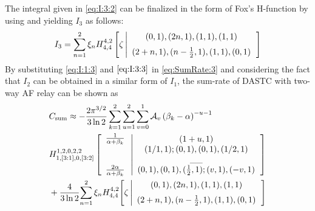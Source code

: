 \documentclass[conference]{IEEEtran}
\newcommand{\Rsum}{C_{\text{sum}}}
\begin{document}
%
%
The integral given in \eqref{eq:I:3:2} can be finalized in the form
of Fox's H-function by using \cite[eq.~(7.811.1)]{GR:00:Book} and
\cite[eq.~(8.3.2.21)]{Prudnikov:90:Book} yielding $I_3$ as follows:
%
%
\begin{align} \label{eq:I:3:3}
    I_3
    =
    \sum\limits_{n=1}^2
    \xi_n
    H_{4,4}^{4,2}\left[{\zeta} \left|{\begin{array}{*{20}c} {(0,1),(2n,1),(1,1),(1,1)}  \vspace{0.2cm}\\
    {(2+n,1),(n-\tfrac{1}{2},1),(1,1),(0,1)} \end{array}} \right.
    \right]
\end{align}
%
%
By substituting \eqref{eq:I:1:3} and $\eqref{eq:I:3:3}$ in
\eqref{eq:SumRate:3} and considering the fact that $I_2$ can be
obtained in a similar form of $I_1$, the sum-rate of DASTC with
two-way AF relay can be shown as
%
%
\begin{align}
    &\Rsum
    \approx
    -\frac{2\pi^{3/2}}{3\ln 2}
    \sum\limits_{k=1}^2
    \sum\limits_{u=1}^{2}
    \sum\limits_{v=0}^{1}
    \mathcal{A}_v
    \left(\beta_k - \alpha\right)^{-u-1}
    \nonumber
    \\
    &
H_{1,[3:1],0,[3:2]}^{1,2,0,2,2}\left[ {\begin{array}{*{20}c}
   \frac{1}{\alpha+\beta_k}  \\
   \\
   \\
   \frac{2\alpha}{\alpha+\beta_k}  \\
\end{array}\left| {\begin{array}{*{20}c}
   (1+u,1)  \\
   (1/1,1);(0,1),(0,1),(1/2,1)  \\
   {\_}{\_} \\
   (0,1),(0,1),(\tfrac{1}{2},1);(v,1),(-v,1)  \\
\end{array}} \right.} \right]
    \nonumber
    \\
    &+
    \frac{4}{3\ln2}
    \!
    \sum\limits_{n=1}^2
    \xi_n
    H_{4,4}^{4,2} \! \left[{\zeta} \left|{\begin{array}{*{20}c} {(0,1),(2n,1),(1,1),(1,1)}  \vspace{0.2cm}\\
    {(2+n,1),(n-\tfrac{1}{2},1),(1,1),(0,1)} \end{array}} \right.
    \right]
\end{align}
%
%
\end{document}
